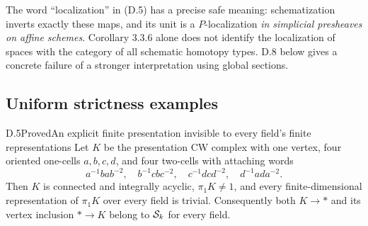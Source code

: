 The word ``localization'' in (D.5) has a precise safe meaning:
schematization inverts exactly these maps, and its unit is a
$P$-localization \emph{in simplicial presheaves on affine schemes}.
Corollary 3.3.6 alone does not identify the localization of spaces with
the category of all schematic homotopy types. D.8 below gives a
concrete failure of a stronger interpretation using global sections.

\subsection{Uniform strictness examples}

\begin{claim}{D.5}{Proved}{An explicit finite presentation invisible to every field's finite representations}
\label{D5}
Let $K$ be the presentation CW complex with one vertex, four oriented
one-cells $a,b,c,d$, and four two-cells with attaching words
\[
 a^{-1}ba b^{-2},\quad b^{-1}cb c^{-2},\quad
 c^{-1}dc d^{-2},\quad d^{-1}ad a^{-2}.
 \tag{D.6}
\]
Then $K$ is connected and integrally acyclic, $\pi_1K\ne1$, and
every finite-dimensional representation of $\pi_1K$ over every field
is trivial. Consequently both $K\to *$ and its vertex inclusion
$*\to K$ belong to $\mathcal S_k$ for every field.
\end{claim}
